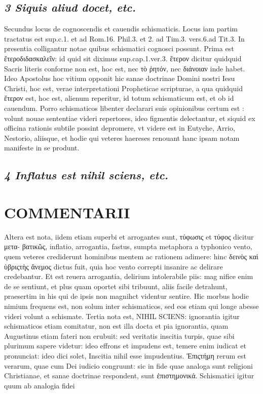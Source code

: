 \documentclass{article}
\begin{document}
\begin{pages}
\subsection*{\textit{3 Siquis aliud docet, etc. }}\pstart Secundus locus de cognoscendis et cauendis schismaticis. Locus iam partim tractatus est sup.c.1. et ad Rom.16. Phil.3. et 2. ad Tim.3. vers.6.ad Tit.3. In presentia colligantur notae quibus schismatici cognosci possunt.  \pend\pstart Prima est ἔτεροδιδασκαλεῖν: id quid sit diximus sup.cap.1.ver.3. ἕτερον dicitur quidquid Sacris literis conforme non est, hoc est, nec τὸ ῥητόν, nec διάνοιαν inde habet. Ideo Apostolus hoc vitium opponit hic sanae doctrinae Domini nostri Iesu Christi, hoc est, verae interpretationi Propheticae scripturae, a qua quidquid ἕτερον est, hoc est, alienum reperitur, id totum schismaticum est, et ob id cauendum. Porro schismaticos libenter declarari suis opinionibus certum est : volunt nouae sententiae videri repertores, ideo figmentis delectantur, et siquid ex officina rationis subtile possint depromere, vt videre est in Eutyche, Arrio, Nestorio, aliisque, et hodie qui veteres haereses renouant hanc ipsam notam manifeste in se produnt.  \pend
{}
{}
\subsection*{\textit{4 Inflatus est nihil sciens, etc. }}
\section*{COMMENTARII }
\marginpar{[ p.150 ]}\pstart Altera est nota, iidem etiam superbi et arrogantes sunt, τύφωσις et τύφος dicitur  μετα- βατικῶς, inflatio, arrogantia, fastus, sumpta metaphora a typhonico vento, quem veteres crediderunt hominibus mentem ac rationem adimere: hinc δεινὸς καὶ ὑβριςτὴς ἄνεμος dictus fuit, quia hoc vento correpti insanire ac delirare credebantur. Et est reuera arrogantia, delirium intolerabile piis: mag nifice enim de se sentiunt, et plus quam oportet sibi tribuunt, aliis facile detrahunt, praesertim in his qui de ipsis non magnihct videntur sentire. Hic morbus hodie nimium frequens est, non solum inter schismaticos, sed eos etiam qui longe abesse videri volunt a schismate.  \pend\pstart Tertia nota est, NIHIL SCIENS: ignorantia igitur schismaticos etiam comitatur, non est illa docta et pia ignorantia, quam Augustinus etiam fateri non erubuit: sed veritatis inscitia turpis, quae sibi plurimum sapere videtur: ideo effrons et impudens est, temere enim iudicat et pronunciat: ideo dici solet, Inscitia nihil esse impudentius. Ἐπιςτήμη rerum est verarum, quae cum Dei iudicio congruunt: sic in fide quae analoga sunt religioni Christianae, et sanae doctrinae respondent, sunt ἑπιστημονικά. Schismatici igitur quum ab analogia fidei  \pend

\end{pages}
\end{document}
